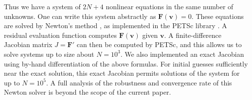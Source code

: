 \documentclass[twocolumn,letterpaper]{igs}
\begin{document}
Thus we have a system of $2N+4$ nonlinear equations in the same number of unknowns.  One can write this system abstractly as $\mathbf{F}(\mathbf{v})=0$.  These equations are solved by Newton's method \citep{Kelley}, as implemented in the PETSc library \citep{petsc-user-ref}.  A residual evaluation function computes $\mathbf{F}(\mathbf{v})$ given $\mathbf{v}$.  A finite-difference Jacobian matrix $J=\mathbf{F}'$ can then be computed by PETSc, and this allows us to solve systems up to size about $N=10^3$.  We also implemented an exact Jacobian using by-hand differentiation of the above formulas.  For initial guesses sufficiently near the exact solution, this exact Jacobian permits solutions of the system for up to $N=10^5$.  A full analysis of the robustness and convergence rate of this Newton solver is beyond the scope of the current paper.
\end{document}
